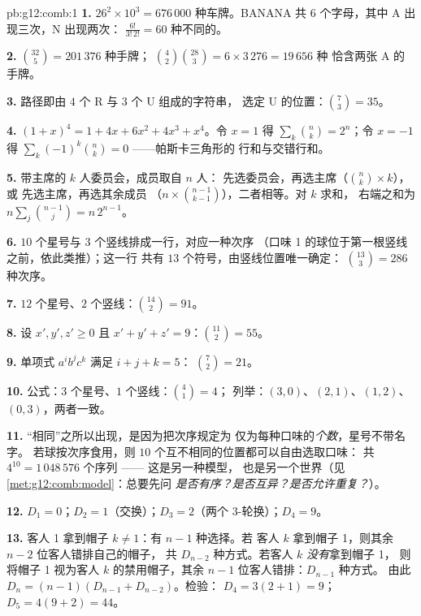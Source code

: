 \begin{solution}{pb:g12:comb:1}
\textbf{1.} $26^2 \times 10^3 = 676\,000$ 种车牌。BANANA 共 $6$
个字母，其中 A 出现三次，N 出现两次：
$\frac{6!}{3!\,2!} = 60$ 种不同的。

\textbf{2.} $\binom{32}{5} = 201\,376$ 种手牌；
$\binom42 \binom{28}{3} = 6 \times 3\,276 = 19\,656$ 种
恰含两张 A 的手牌。

\textbf{3.} 路径即由 $4$ 个 R 与 $3$ 个 U 组成的字符串，
选定 U 的位置：$\binom73 = 35$。

\textbf{4.} $(1+x)^4 = 1 + 4x + 6x^2 + 4x^3 + x^4$。令
$x = 1$ 得 $\sum_k \binom nk = 2^n$；令 $x = -1$ 得
$\sum_k (-1)^k \binom nk = 0$ ——帕斯卡三角形的
行和与交错行和。

\textbf{5.} 带主席的 $k$ 人委员会，成员取自 $n$ 人：
先选委员会，再选主席（$\binom nk \times k$），或
先选主席，再选其余成员
（$n \times \binom{n-1}{k-1}$），二者相等。对 $k$ 求和，
右端之和为 $n \sum_j \binom{n-1}{j} = n\,2^{n-1}$。

\textbf{6.} $10$ 个星号与 $3$ 个竖线排成一行，对应一种次序
（口味 1 的球位于第一根竖线之前，依此类推）；这一行
共有 $13$ 个符号，由竖线位置唯一确定：
$\binom{13}{3} = 286$ 种次序。

\textbf{7.} $12$ 个星号、$2$ 个竖线：$\binom{14}{2} = 91$。

\textbf{8.} 设 $x', y', z' \geq 0$ 且
$x' + y' + z' = 9$：$\binom{11}{2} = 55$。

\textbf{9.} 单项式 $a^i b^j c^k$ 满足 $i + j + k = 5$：
$\binom72 = 21$。

\textbf{10.} 公式：$3$ 个星号、$1$ 个竖线：$\binom41 = 4$；
列举：$(3,0)$、$(2,1)$、$(1,2)$、$(0,3)$，两者一致。

\textbf{11.} “相同”之所以出现，是因为把次序规定为
仅为每种口味的\emph{个数}，星号不带名字。
若球按次序食用，则
$10$ 个互不相同的位置都可以自由选取口味：
共 $4^{10} = 1\,048\,576$ 个序列 —— 这是另一种模型，
也是另一个世界（见\cref{met:g12:comb:model}：总要先问
\emph{是否有序？是否互异？是否允许重复？}）。

\textbf{12.} $D_1 = 0$；$D_2 = 1$（交换）；$D_3 = 2$（两个
$3$-轮换）；$D_4 = 9$。

\textbf{13.} 客人 1 拿到帽子 $k \neq 1$：有 $n - 1$ 种选择。若
客人 $k$ 拿到帽子 1，则其余 $n - 2$ 位客人错排自己的帽子，
共 $D_{n-2}$ 种方式。若客人 $k$ \emph{没有}拿到帽子 1，
则将帽子 1 视为客人 $k$ 的禁用帽子，其余
$n - 1$ 位客人错排：$D_{n-1}$ 种方式。
由此 $D_n = (n-1)(D_{n-1} + D_{n-2})$。检验：
$D_4 = 3(2 + 1) = 9$；$D_5 = 4(9 + 2) = 44$。


\end{solution}
